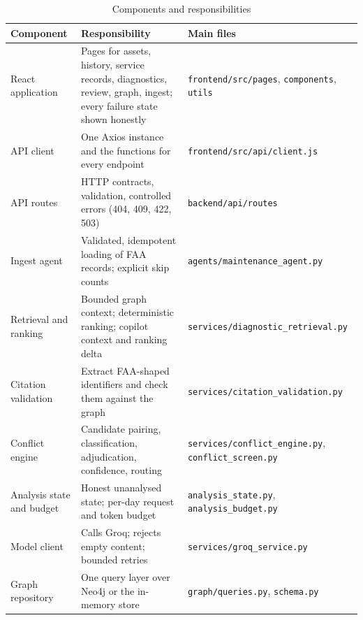 \begin{table}[H]
\centering
\caption{Components and responsibilities}
\label{tab:components}
\small
\begin{tabularx}{\textwidth}{@{}>{\raggedright\arraybackslash}p{} L >{\raggedright\arraybackslash}p{0.28\textwidth}@{}}
\toprule
Component & Responsibility & Main files \\
\midrule
React application & Pages for assets, history, service records, diagnostics, review, graph, ingest; every failure state shown honestly & \texttt{frontend/src/pages}, \texttt{components}, \texttt{utils} \\
API client & One Axios instance and the functions for every endpoint & \texttt{frontend/src/api/client.js} \\
API routes & HTTP contracts, validation, controlled errors (404, 409, 422, 503) & \texttt{backend/api/routes} \\
Ingest agent & Validated, idempotent loading of FAA records; explicit skip counts & \texttt{agents/maintenance\_agent.py} \\
Retrieval and ranking & Bounded graph context; deterministic ranking; copilot context and ranking delta & \texttt{services/diagnostic\_retrieval.py} \\
Citation validation & Extract FAA-shaped identifiers and check them against the graph & \texttt{services/citation\_validation.py} \\
Conflict engine & Candidate pairing, classification, adjudication, confidence, routing & \texttt{services/conflict\_engine.py}, \texttt{conflict\_screen.py} \\
Analysis state and budget & Honest unanalysed state; per-day request and token budget & \texttt{analysis\_state.py}, \texttt{analysis\_budget.py} \\
Model client & Calls Groq; rejects empty content; bounded retries & \texttt{services/groq\_service.py} \\
Graph repository & One query layer over Neo4j or the in-memory store & \texttt{graph/queries.py}, \texttt{schema.py} \\
\bottomrule
\end{tabularx}
\end{table}
